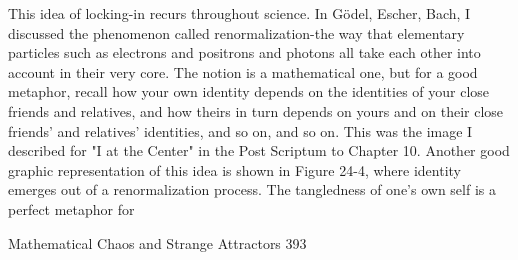         This idea of locking-in recurs throughout science. In Gödel, Escher, Bach, I
discussed the phenomenon called renormalization-the way that elementary particles
such as electrons and positrons and photons all take each other into account in their
very core. The notion is a mathematical one, but for a good metaphor, recall how your
own identity depends on the identities of your close friends and relatives, and how
theirs in turn depends on yours and on their close friends' and relatives' identities, and
so on, and so on. This was the image I described for "I at the Center" in the Post
Scriptum to Chapter 10. Another good graphic representation of this idea is shown in
Figure 24-4, where identity emerges out of a renormalization process.
        The tangledness of one's own self is a perfect metaphor for




Mathematical Chaos and Strange Attractors                                             393

